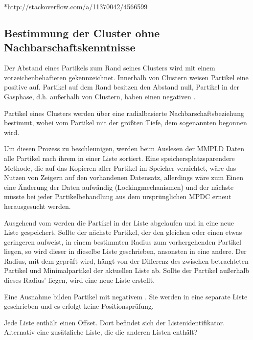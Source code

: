 *http://stackoverflow.com/a/11370042/4566599


\subsection{Bestimmung der Cluster ohne Nachbarschaftskenntnisse}
Der Abstand eines Partikels zum Rand seines Clusters wird mit einem vorzeichenbehafteten  gekennzeichnet. Innerhalb von Clustern weisen Partikel eine positive  auf. Partikel auf dem Rand besitzen den Abstand null, Partikel in der Gasphase, d.h. außerhalb von Clustern, haben einen negativen .

Partikel eines Clusters werden über eine radialbasierte Nachbarschaftsbeziehung bestimmt, wobei vom Partikel mit der größten Tiefe, dem sogenannten  begonnen wird.

Um diesen Prozess zu beschleunigen, werden beim Auslesen der MMPLD Daten alle Partikel nach ihrem  in einer Liste sortiert. Eine speichersplatzsparendere Methode, die auf das Kopieren aller Partikel im Speicher verzichtet, wäre das Nutzen von Zeigern auf den vorhandenen Datensatz, allerdings wäre zum Einen eine Änderung der Daten aufwändig (Lockingmechanismen) und der nächste  müsste bei jeder Partikelbehandlung aus dem ursprünglichen MPDC erneut herausgesucht werden.

Ausgehend vom  werden die Partikel in der Liste abgelaufen und in eine neue Liste gespeichert. Sollte der nächste Partikel, der den gleichen oder einen etwas geringeren  aufweist, in einem bestimmten Radius zum vorhergehenden Partikel liegen, so wird dieser in dieselbe Liste geschrieben, ansonsten in eine andere. Der Radius, mit dem geprüft wird, hängt von der Differenz des  zwischen betrachteten Partikel und Minimalpartikel der aktuellen Liste ab. Sollte der Partikel außerhalb dieses Radius' liegen, wird eine neue Liste erstellt.

Eine Ausnahme bilden Partikel mit negativem . Sie werden in eine separate Liste geschrieben und es erfolgt keine Positionsprüfung.

Jede Liste enthält einen Offset. Dort befindet sich der Listenidentifikator. Alternativ eine zusätzliche Liste, die die anderen Listen enthält?

